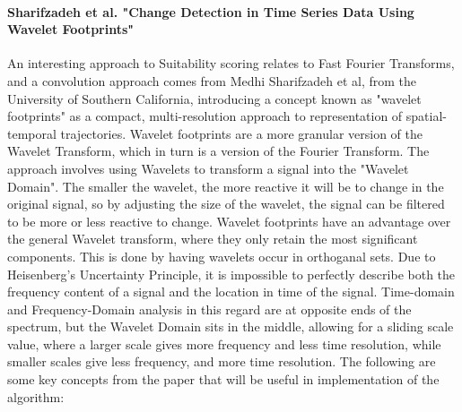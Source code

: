 \documentclass[12pt,a4paper]{article}
\begin{document}
\paragraph{Sharifzadeh et al. "Change Detection in Time Series Data Using Wavelet Footprints"}
An interesting approach to Suitability scoring relates to Fast Fourier Transforms, and a convolution approach comes from Medhi Sharifzadeh et al, from the University of Southern California, introducing a concept known as
"wavelet footprints" as a compact, multi-resolution approach to representation of spatial-temporal trajectories. Wavelet footprints are a  more granular version of the Wavelet Transform, which in turn is a version of the Fourier Transform. The approach involves using Wavelets to transform a signal into the "Wavelet Domain".
The smaller the wavelet, the more reactive it will be to change in the original signal, so by adjusting the size of the wavelet, the signal can be filtered to be more or less reactive to change.
Wavelet footprints have an advantage over the general Wavelet transform, where they only retain the most significant components. This is done by having wavelets occur in orthoganal sets.
Due to Heisenberg's Uncertainty Principle, it is impossible to perfectly describe both the frequency content of a signal and the location in time of the signal. Time-domain and Frequency-Domain analysis in this regard are
at opposite ends of the spectrum, but the Wavelet Domain sits in the middle, allowing for a sliding scale value, where a larger scale gives more frequency and less time resolution, while smaller scales give less frequency, and more time resolution.
The following are some key concepts from the paper that will be useful in implementation of the algorithm:
\end{document}
